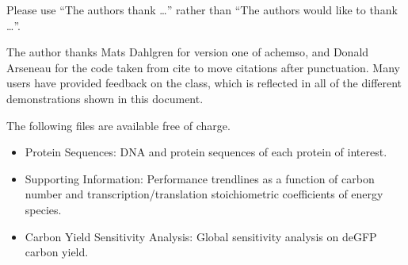 \documentclass[journal=asbcd6,manuscript=article]{achemso}
\begin{document}
\begin{acknowledgement}

Please use ``The authors thank \ldots'' rather than ``The
authors would like to thank \ldots''.

The author thanks Mats Dahlgren for version one of \textsf{achemso},
and Donald Arseneau for the code taken from \textsf{cite} to move
citations after punctuation. Many users have provided feedback on the
class, which is reflected in all of the different demonstrations
shown in this document.

\end{acknowledgement}

\begin{suppinfo}
The following files are available free of charge.
\begin{itemize}
  \item Protein Sequences: DNA and protein sequences of each protein of interest.
  \item Supporting Information: Performance trendlines as a function of carbon number and transcription/translation stoichiometric coefficients of energy species.
  \item Carbon Yield Sensitivity Analysis: Global sensitivity analysis on deGFP carbon yield.
\end{itemize}
\end{suppinfo}


\end{document}
